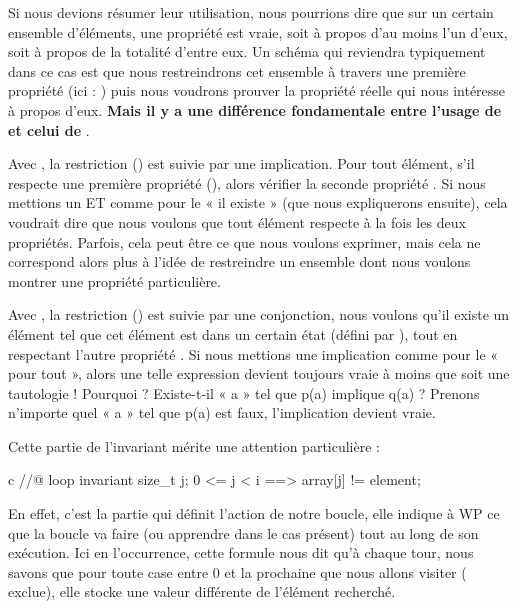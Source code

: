 Si nous devions résumer leur utilisation, nous pourrions dire que sur un certain
ensemble d'éléments, une propriété est vraie, soit à propos d'au moins l'un
d'eux, soit à propos de la totalité d'entre eux. Un schéma qui reviendra 
typiquement dans ce cas est que nous restreindrons cet ensemble à travers une
première propriété (ici : ) puis nous voudrons prouver la
propriété réelle qui nous intéresse à propos d'eux. \textbf{Mais il y a une 
différence fondamentale entre l'usage de  et celui de }.



Avec , la restriction () est suivie
par une implication. Pour tout élément, s'il respecte une première propriété 
(), alors vérifier la seconde propriété . Si nous mettions un ET
comme pour le « il existe » (que nous expliquerons ensuite), cela voudrait dire que 
nous voulons que tout élément respecte à la fois les deux propriétés. Parfois, 
cela peut être ce que nous voulons exprimer, mais cela ne correspond alors plus 
à l'idée de restreindre un ensemble dont nous voulons montrer une propriété 
particulière.



Avec , la restriction () est suivie
par une conjonction, nous voulons qu'il existe un élément tel que cet élément 
est dans un certain état (défini par ), tout en respectant l'autre 
propriété . Si nous mettions une implication comme pour le « pour tout », 
alors une telle expression devient toujours vraie à moins que  soit une 
tautologie ! Pourquoi ? Existe-t-il « a » tel que p(a) implique q(a) ? Prenons 
n'importe quel « a » tel que p(a) est faux, l'implication devient vraie.



Cette partie de l'invariant mérite une attention particulière :



\begin{CodeBlock}{c}
//@ loop invariant \forall size_t j; 0 <= j < i ==> array[j] != element;
\end{CodeBlock}



En effet, c'est la partie qui définit l'action de notre boucle, elle indique à
WP ce que la boucle va faire (ou apprendre dans le cas présent) tout au long de
son exécution. Ici en l'occurrence, cette formule nous dit qu'à chaque tour, nous 
savons que pour toute case entre 0 et la prochaine que nous allons visiter ( exclue), elle stocke une valeur différente de l'élément recherché.




